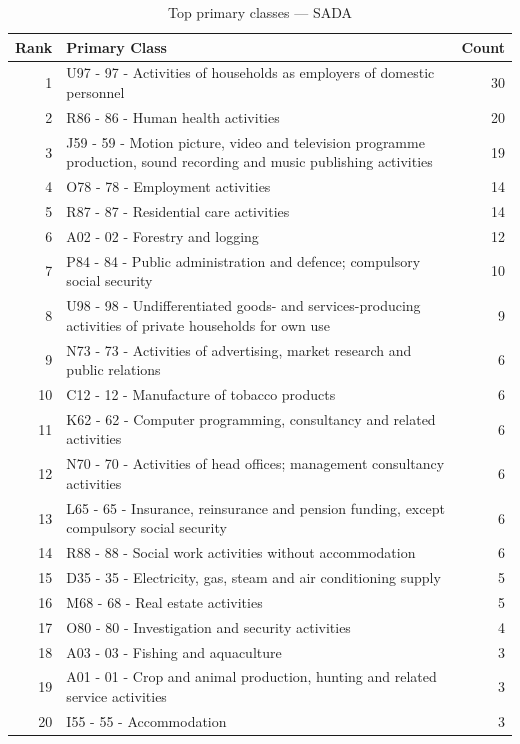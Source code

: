 \begin{table}[h]
    \centering
    \begin{tabular}{r p{10cm} r}
    \hline
    \textbf{Rank} & \textbf{Primary Class} & \textbf{Count} \\
    \hline
    1 & U97 - 97 - Activities of households as employers of domestic personnel & 30 \\
    2 & R86 - 86 - Human health activities & 20 \\
    3 & J59 - 59 - Motion picture, video and television programme production, sound recording and music publishing activities & 19 \\
    4 & O78 - 78 - Employment activities & 14 \\
    5 & R87 - 87 - Residential care activities & 14 \\
    6 & A02 - 02 - Forestry and logging & 12 \\
    7 & P84 - 84 - Public administration and defence; compulsory social security & 10 \\
    8 & U98 - 98 - Undifferentiated goods- and services-producing activities of private households for own use & 9 \\
    9 & N73 - 73 - Activities of advertising, market research and public relations & 6 \\
    10 & C12 - 12 - Manufacture of tobacco products & 6 \\
    11 & K62 - 62 - Computer programming, consultancy and related activities & 6 \\
    12 & N70 - 70 - Activities of head offices; management consultancy activities & 6 \\
    13 & L65 - 65 - Insurance, reinsurance and pension funding, except compulsory social security & 6 \\
    14 & R88 - 88 - Social work activities without accommodation & 6 \\
    15 & D35 - 35 - Electricity, gas, steam and air conditioning supply & 5 \\
    16 & M68 - 68 - Real estate activities & 5 \\
    17 & O80 - 80 - Investigation and security activities & 4 \\
    18 & A03 - 03 - Fishing and aquaculture & 3 \\
    19 & A01 - 01 - Crop and animal production, hunting and related service activities & 3 \\
    20 & I55 - 55 - Accommodation & 3 \\
    \hline
    \end{tabular}
    \caption{Top primary classes --- SADA}
\end{table}

